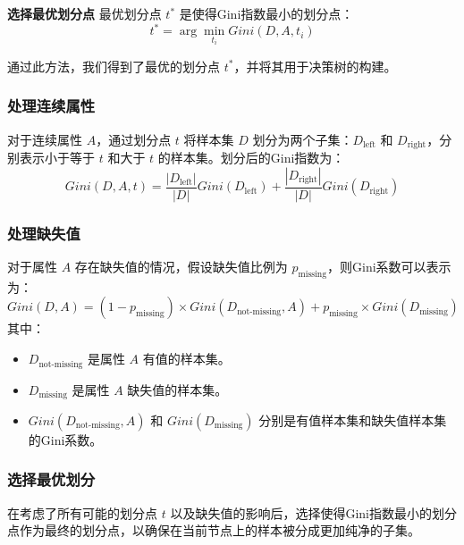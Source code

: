 \par
\textbf{选择最优划分点}
最优划分点 \(t^*\) 是使得Gini指数最小的划分点：
\begin{equation}
	t^* = \arg\min_{t_i} Gini(D, A, t_i)
\end{equation}

通过此方法，我们得到了最优的划分点 \(t^*\)，并将其用于决策树的构建。
\vspace*{1cm}
\subsubsection*{处理连续属性}
对于连续属性 \(A\)，通过划分点 \(t\) 将样本集 \(D\) 划分为两个子集：\(D_{\text{left}}\) 和 \(D_{\text{right}}\)，分别表示小于等于 \(t\) 和大于 \(t\) 的样本集。划分后的Gini指数为：
\begin{equation}
	Gini(D, A, t) = \frac{|D_{\text{left}}|}{|D|} Gini(D_{\text{left}}) + \frac{|D_{\text{right}}|}{|D|} Gini(D_{\text{right}})
\end{equation}

\vspace*{1cm}
\subsubsection*{处理缺失值}
对于属性 \(A\) 存在缺失值的情况，假设缺失值比例为 \(p_{\text{missing}}\)，则Gini系数可以表示为：
\begin{equation}
	Gini(D, A) = (1 - p_{\text{missing}}) \times Gini(D_{\text{not-missing}}, A) + p_{\text{missing}} \times Gini(D_{\text{missing}})
\end{equation}
其中：
\begin{itemize}
	\item \(D_{\text{not-missing}}\) 是属性 \(A\) 有值的样本集。
	\item \(D_{\text{missing}}\) 是属性 \(A\) 缺失值的样本集。
	\item \(Gini(D_{\text{not-missing}}, A)\) 和 \(Gini(D_{\text{missing}})\) 分别是有值样本集和缺失值样本集的Gini系数。
\end{itemize}
\vspace*{1cm}

\subsubsection*{选择最优划分}
在考虑了所有可能的划分点 \(t\) 以及缺失值的影响后，选择使得Gini指数最小的划分点作为最终的划分点，以确保在当前节点上的样本被分成更加纯净的子集。
\vspace*{1cm}

